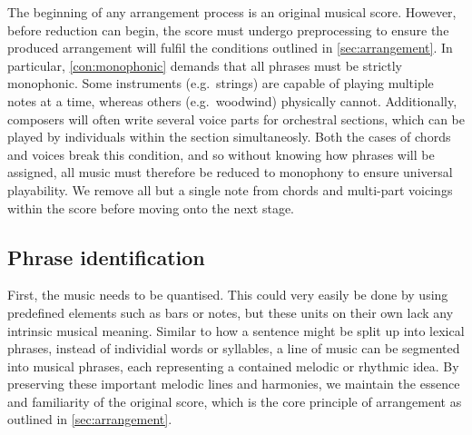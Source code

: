 \documentclass[12pt]{article}
\theoremstyle{definition}
\begin{document}
The beginning of any arrangement process is an original musical score. However, before reduction can begin, the score must undergo preprocessing to ensure the produced arrangement will fulfil the conditions outlined in \cref{sec:arrangement}. In particular, \cref{con:monophonic} demands that all phrases must be strictly monophonic. Some instruments (e.g.\ strings) are capable of playing multiple notes at a time, whereas others (e.g.\ woodwind) physically cannot. Additionally, composers will often write several voice parts for orchestral sections, which can be played by individuals within the section simultaneosly. Both the cases of chords and voices break this condition, and so without knowing how phrases will be assigned, all music must therefore be reduced to monophony to ensure universal playability. We remove all but a single note from chords and multi-part voicings within the score before moving onto the next stage.


\subsection{Phrase identification}

First, the music needs to be quantised. This could very easily be done by using predefined elements such as bars or notes, but these units on their own lack any intrinsic musical meaning. Similar to how a sentence might be split up into lexical phrases, instead of individial words or syllables, a line of music can be segmented into musical phrases, each representing a contained melodic or rhythmic idea. By preserving these important melodic lines and harmonies, we maintain the essence and familiarity of the original score, which is the core principle of arrangement as outlined in \cref{sec:arrangement}.
\end{document}
